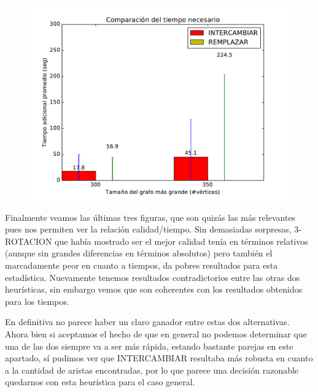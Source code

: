 \begin{figure}[H]
\begin{minipage}{0.49\textwidth}
  \centering
    \includegraphics[width=1\textwidth]{graficos/problema_5/tiempo4.pdf}
  \caption{}
  \label{fig:tiempo3}
\end{minipage}%
\end{figure}

Finalmente veamos las últimas tres figuras, que son quizás las más relevantes pues nos permiten ver la relación calidad/tiempo. Sin demasiadas sorpresas, 3-ROTACION que había mostrado ser el mejor calidad tenía en términos relativos (aunque sin grandes diferencias en términos absolutos) pero también el marcadamente peor en cuanto a tiempos, da pobres resultados para esta estadística. Nuevamente tenemos resultados contradictorios entre las otras dos heurísticas, sin embargo vemos que son coherentes con los resultados obtenidos para los tiempos. 

En definitiva no parece haber un claro ganador entre estas dos alternativas. Ahora bien si aceptamos el hecho de que en general no podemos determinar que una de las dos siempre va a ser más rápida, estando bastante parejas en este apartado, sí pudimos ver que INTERCAMBIAR resultaba más robusta en cuanto a la cantidad de aristas encontradas, por lo que parece una decisión razonable quedarnos con esta heurística para el caso general. 

